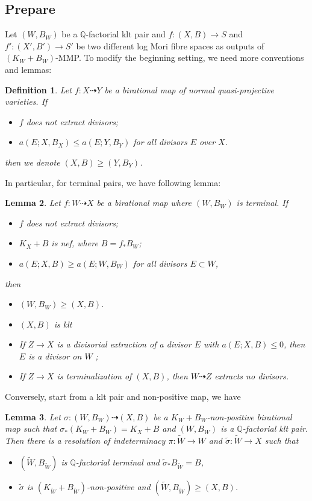 \documentclass[11pt]{amsart}
\numberwithin{equation}{section}
\newtheorem{defn}{Definition}[subsection]
\newtheorem{lem}[defn]{Lemma}
\begin{document}
\subsection{Prepare}
Let $(W,B_W)$ be a $\mathbb{Q}$-factorial klt pair and $f:(X,B)\to S$ and $f':(X',B')\to S'$ be two different log Mori fibre spaces as outputs of $(K_{W}+B_{W})$-MMP.  To modify the beginning setting, we need more conventions and lemmas:
\begin{defn}
Let $f:X\dashrightarrow Y$ be a birational map of normal quasi-projective varieties. If
\begin{itemize}
  \item $f$ does not extract divisors;
  \item $a(E;X,B_{X})\leqslant a(E;Y,B_{Y})$ for all divisors  $E$  over $X$.
\end{itemize}
then we denote $(X,B)\geqslant (Y,B_{Y})$.
\end{defn}
In particular, for terminal pairs, we have following lemma: 
\begin{lem}\label{terminalorder}
\cite[Lemma 13.8]{haconMinimalModelProgram2012} Let $f:W\dashrightarrow X$ be a birational map where $(W,B_W)$ is terminal. If
\begin{itemize}
  \item $f$ does not extract divisors;
  \item $K_X+B$ is nef, where $B=f_*B_W$;
  \item $a(E;X,B)\geqslant a(E;W,B_W)$ for all divisors $E \subset W$,
\end{itemize}
then
\begin{itemize}
  \item $(W,B_W)\geqslant (X,B)$.
  \item $(X,B)$ is klt
  \item If $Z\to X$ is a divisorial extraction of a divisor $E$ with $a(E;X,B)\leqslant 0$, then $E$ is a divisor on $W$ ;
  \item If $Z\to X$ is terminalization of $(X,B)$, then $W\dashrightarrow Z$ extracts no divisors.
\end{itemize}
\end{lem}
Conversely, start from a klt pair and non-positive map, we have
\begin{lem}\label{terminalresolution}
  \cite[Lemma 3.5]{liuSarkisovProgramGeneralized2021} Let $\sigma:(W,B_W)\dashrightarrow (X,B)$ be a $K_W+B_W$-non-positive birational map such that $\sigma_*(K_W+B_W)=K_X+B$ and $(W,B_W)$ is a $\mathbb{Q}$-factorial klt pair. Then there is a resolution of indeterminacy $\pi:\tilde{W}\to W $ and $\tilde{\sigma}:\tilde{W}\to X$ such that
\begin{itemize}
  \item $(\tilde{W},B_{\tilde{W}})$ is $\mathbb{Q}$-factorial terminal and $\tilde{\sigma}_*B_{\tilde{W}}=B$,
  \item $\tilde{\sigma}$ is $(K_{\tilde{W}}+B_{\tilde{W}})$-non-positive and $(\tilde{W},B_{\tilde{W}})\geqslant (X,B)$.
\end{itemize}
\end{lem}
\end{document}
